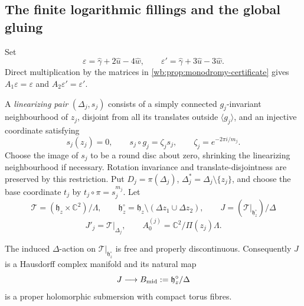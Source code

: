 \subsection{The finite logarithmic fillings and the global gluing}

Set
\[
 \varepsilon=\widehat\gamma+2\widehat u-4\widehat w,
 \qquad
 \varepsilon'=\widehat\gamma+3\widehat u-3\widehat w.
 \tag{2.8a}
\]
Direct multiplication by the matrices in
\cref{wb:prop:monodromy-certificate} gives
\(A_1\varepsilon=\varepsilon\) and
\(A_2\varepsilon'=\varepsilon'\).

A \emph{linearizing pair} \((\Delta_j,s_j)\) consists of a simply connected
\(g_j\)-invariant neighbourhood of \(z_j\), disjoint from all its translates
outside \(\langle g_j\rangle\), and an injective coordinate satisfying
\[
 s_j(z_j)=0,\qquad s_j\circ g_j=\zeta_js_j,
 \qquad \zeta_j=e^{-2\pi i/m_j}.
 \tag{2.8b}
\]
Choose the image of \(s_j\) to be a round disc about zero, shrinking the
linearizing neighbourhood if necessary.  Rotation invariance and
translate-disjointness are preserved by this restriction.  Put
\(D_j=\pi(\Delta_j)\),
\(\Delta_j^*=\Delta_j\setminus\{z_j\}\), and choose the base coordinate
\(t_j\) by \(t_j\circ\pi=s_j^{m_j}\).  Let
\[
 \mathcal T=(\mathfrak h_z\times\mathbb C^2)/\Lambda,
 \qquad
 \mathfrak h_z^\circ=\mathfrak h_z\setminus
 (\Delta z_1\cup\Delta z_2),
 \qquad
 J=(\mathcal T|_{\mathfrak h_z^\circ})/\Delta
 \]
\[
 J'_j=\mathcal T|_{\Delta_j},
 \qquad
 A_0^{(j)}=\mathbb C^2/\Pi(z_j)\Lambda.
 \tag{2.8c}
\]

\begin{lemma}
\label{wb:lem:middle-period-proper}
The induced \(\Delta\)-action on
\(\mathcal T|_{\mathfrak h_z^\circ}\) is free and properly discontinuous.
Consequently \(J\) is a Hausdorff complex manifold and its natural map
\[
 J\longrightarrow B_{\rm mid}:=\mathfrak h_z^\circ/\Delta
\]
is a proper holomorphic submersion with compact torus fibres.
\end{lemma}

